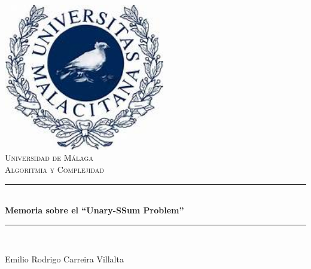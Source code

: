 
\begin{titlepage}


\newcommand{\HRule}{\rule{\linewidth}{0.5mm}} %





\begin{center} 



\includegraphics[width = 7cm]{./figures/th}\\[1.5cm] 
\textsc{\Large Universidad de Málaga}\\[0.5cm] 
\textsc{\large Algoritmia y Complejidad}\\[0.95cm] 






\HRule \\[0.4cm]
{ \huge \bfseries Memoria sobre el ``Unary-SSum Problem'' }\\  
\HRule \\[1.5cm]
\end{center}





\begin{center}
     Emilio Rodrigo Carreira Villalta
    
    
     
\end{center}
     



\vfill



\makeatother


\end{titlepage}


